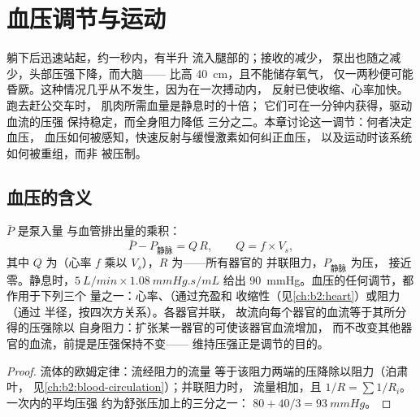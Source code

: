\chapter{血压调节与运动}\label{ch:b2:blood-pressure}

躺下后迅速站起，约一秒内，有半升
流入腿部的；接收的减少，
泵出也随之减少，头部压强下降，而大脑——
比高 \qty{40}{cm}，且不能储存氧气，
仅一两秒便可能昏厥。这种情况几乎从不发生，因为在一次搏动内，
反射已使收缩、心率加快。跑去赶公交车时，
肌肉所需血量是静息时的十倍；
它们可在一分钟内获得，驱动血流的压强
保持稳定，而全身阻力降低
三分之二。本章讨论这一调节：何者决定血压，
血压如何被感知，快速反射与缓慢激素如何纠正血压，
以及运动时该系统如何被重组，而非
被压制。

\section{血压的含义}

\begin{theorem}[循环方程]\label{thm:b2:blood-pressure:equation}
 $\bar P$ 是泵入量
与血管排出量的乘积：
\[
\bar P - P_{\text{静脉}} = Q\,R, \qquad Q = f\times V_s,
\]
其中 $Q$ 为（心率 $f$ 乘以
$V_s$），$R$ 为——所有器官的
并联阻力，$P_{\text{静脉}}$ 为压，
接近零。静息时，$\qty{5}{L/min}\times\qty{1.08}{mmHg.s/mL}$ 给出
\qty{90}{mmHg}。血压的任何调节，都作用于下列三个
量之一：心率、（通过充盈和
收缩性（见\cref{ch:b2:heart}）或阻力（通过
半径，按四次方关系）。各器官并联，
故流向每个器官的血流等于其所分得的压强除以
自身阻力：扩张某一器官的可使该器官血流增加，
而不改变其他器官的血流，前提是压强保持不变——
维持压强正是调节的目的。
\end{theorem}
\begin{proof}
流体的欧姆定律：流经阻力的流量
等于该阻力两端的压降除以阻力（泊肃叶，
见\cref{ch:b2:blood-circulation}）；并联阻力时，
流量相加，且 $1/R = \sum 1/R_i$。一次内的平均压强
约为舒张压加上的三分之一：
$80 + 40/3 = \qty{93}{mmHg}$。
\end{proof}

